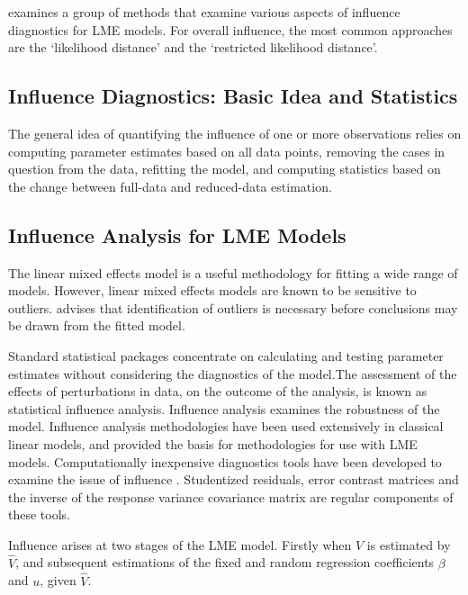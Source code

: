 \documentclass[12pt, a4paper]{article}
\begin{document}
	\citet{west} examines a group of methods that examine various aspects of influence diagnostics for LME models.
	For overall influence, the most common approaches are the `likelihood distance' and the `restricted likelihood distance'.	

	\subsection{Influence Diagnostics: Basic Idea and Statistics} %
	
	The general idea of quantifying the influence of one or more observations relies on computing parameter estimates based on all data points, removing the cases in question from the data, refitting the model, and computing statistics based on the change between full-data and reduced-data estimation. 
	


	
	
	\subsection{Influence Analysis for LME Models} %
	The linear mixed effects model is a useful methodology for fitting a wide range of models. However, linear mixed effects models are known to be sensitive to outliers. \citet{CPJ} advises that identification of outliers is necessary before conclusions may be drawn from the fitted model.
	
	Standard statistical packages concentrate on calculating and testing parameter estimates without considering the diagnostics of the model.The assessment of the effects of perturbations in data, on the outcome of the analysis, is known as statistical influence analysis. Influence analysis examines the robustness of the model. Influence analysis methodologies have been used extensively in classical linear models, and provided the basis for methodologies for use with LME models.
	Computationally inexpensive diagnostics tools have been developed to examine the issue of influence \citep{Zewotir}.
	Studentized residuals, error contrast matrices and the inverse of the response variance covariance matrix are regular components of these tools.
	
	Influence arises at two stages of the LME model. Firstly when $V$ is estimated by $\hat{V}$, and subsequent
	estimations of the fixed and random regression coefficients $\beta$ and $u$, given $\hat{V}$.
	
\end{document}
